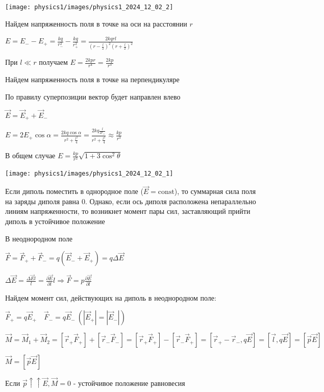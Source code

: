 \documentclass[12pt]{article}
\begin{document}
\begin{center}
    \texttt{[image: physics1/images/physics1\_2024\_12\_02\_2]}
\end{center}

 Найдем напряженность поля в точке на оси на расстоянии $r$

$E = E_- - E_+ = \frac{kq}{r_-^2} - \frac{kq}{r_+^2} = \frac{2kqrl}{(r - \frac{l}{2})^2 (r + \frac{l}{2})^2}$

При $l \ll r$ получаем $E = \frac{2kpr}{r^4} = \frac{2kp}{r^3}$


 Найдем напряженность поля в точке на перпендикуляре

По правилу суперпозиции вектор будет направлен влево

$\vec{E} = \vec{E}_+ + \vec{E}_-$

$E = 2E_+ \cos\alpha = \frac{2kq\cos\alpha}{r^2 + \frac{l^2}{4}} = \frac{2kq\frac{l}{2r_+}}{r^2 + \frac{l^2}{4}} \approx \frac{kp}{r^3}$

 В общем случае $E = \frac{kp}{r^3} \sqrt{1 + 3\cos^2 \theta}$

\begin{center}
    \texttt{[image: physics1/images/physics1\_2024\_12\_02\_1]}
\end{center}

 Если диполь поместить в однородное поле ($\vec{E} = \mathrm{const}$), то суммарная сила поля на заряды диполя равна 0.
Однако, если ось диполя расположена непараллельно линиям напряженности, то возникнет момент пары сил, заставляющий прийти диполь в устойчивое положение

 В неоднородном поле

$\vec{F} = \vec{F}_+ + \vec{F}_- = q(\vec{E}_- + \vec{E}_+) = q\Delta\vec{E}$

$\Delta\vec{E} = \frac{\Delta\vec{E}l}{l} = \frac{\partial \vec{E}}{\partial l}l \Longrightarrow \vec{F} = p\frac{\partial \vec{E}}{\partial l}$

Найдем момент сил, действующих на диполь в неоднородном поле:

$\vec{F}_+ = q\vec{E}_+ \quad \vec{F}_- = q\vec{E}_- \ (|\vec{E}_+| = |\vec{E}_-|)$

$\vec{M} = \vec{M}_1 + \vec{M}_2 = [\vec{r}_+ \vec{F}_+] + [\vec{r}_- \vec{F}_-] = [\vec{r}_+ \vec{F}_+] - [\vec{r}_- \vec{F}_+] = 
[\vec{r}_+ - \vec{r}_-, q\vec{E}] = [\vec{l}, q\vec{E}] = [\vec{p}\vec{E}]$

$\vec{M} = [\vec{p}\vec{E}]$

Если $\vec{p} \uparrow\uparrow \vec{E}, \vec{M} = 0$ - устойчивое положение равновесия
\end{document}
